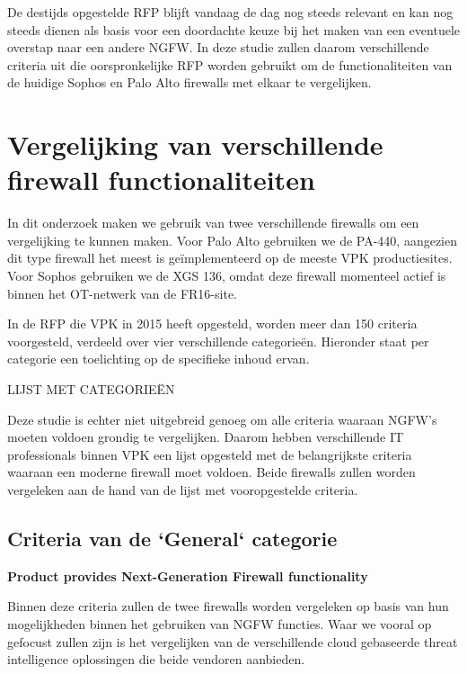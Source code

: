 De destijds opgestelde RFP blijft vandaag de dag nog steeds relevant en kan nog steeds dienen als basis voor een doordachte keuze bij het maken van een eventuele overstap naar een andere NGFW. In deze studie zullen daarom verschillende criteria uit die oorspronkelijke RFP worden gebruikt om de functionaliteiten van de huidige Sophos en Palo Alto firewalls met elkaar te vergelijken.




\section{Vergelijking van verschillende firewall functionaliteiten}
In dit onderzoek maken we gebruik van twee verschillende firewalls om een vergelijking te kunnen maken. Voor Palo Alto gebruiken we de PA-440, aangezien dit type firewall het meest is geïmplementeerd op de meeste VPK productiesites. Voor Sophos gebruiken we de XGS 136, omdat deze firewall momenteel actief is binnen het OT-netwerk van de FR16-site.

In de RFP die VPK in 2015 heeft opgesteld, worden meer dan 150 criteria voorgesteld, verdeeld over vier verschillende categorieën. Hieronder staat per categorie een toelichting op de specifieke inhoud ervan.

LIJST MET CATEGORIEËN

Deze studie is echter niet uitgebreid genoeg om alle criteria waaraan NGFW’s moeten voldoen grondig te vergelijken. Daarom hebben verschillende IT professionals binnen VPK een lijst opgesteld met de belangrijkste criteria waaraan een moderne firewall moet voldoen. Beide firewalls zullen worden vergeleken aan de hand van de lijst met vooropgestelde criteria.


\subsection{Criteria van de `General` categorie}

\textbf{Product provides Next-Generation Firewall functionality}

Binnen deze criteria zullen de twee firewalls worden vergeleken op basis van hun mogelijkheden binnen het gebruiken van NGFW functies. Waar we vooral op gefocust zullen zijn is het vergelijken van de verschillende cloud gebaseerde threat intelligence oplossingen die beide vendoren aanbieden.

